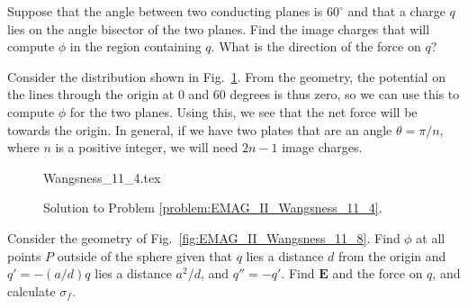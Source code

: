                 \begin{problem}
                    \label{problem:EMAG_II_Wangsness_11_4}
                    Suppose that the angle between two conducting planes
                    is $60^{\circ}$ and that a charge $q$ lies on the
                    angle bisector of the two planes. Find the image
                    charges that will compute $\phi$ in the region
                    containing $q$. What is the direction of the force
                    on $q$?
                \end{problem}
                \begin{solution}
                    Consider the distribution shown in
                    Fig.~\ref{fig:EMAG_II_Wangsness_11_4}. From the
                    geometry, the potential on the lines through the
                    origin at $0$ and $60$ degrees is thus zero, so we
                    can use this to compute $\phi$ for the two planes.
                    Using this, we see that the net force will be
                    towards the origin. In general, if we have two plates
                    that are an angle $\theta=\pi/n$, where $n$ is a
                    positive integer, we will need $2n-1$ image charges.
                \end{solution}
                \begin{figure}[H]
                    \centering
                    \captionsetup{type=figure}
                    {Wangsness_11_4.tex}
                    \caption{Solution to Problem
                             \ref{problem:EMAG_II_Wangsness_11_4}.}
                    \label{fig:EMAG_II_Wangsness_11_4}
                \end{figure}
                \begin{problem}
                    \label{problem:EMAG_II_Wangsness_11_8}
                    Consider the geometry of
                    Fig.~\ref{fig:EMAG_II_Wangsness_11_8}. Find
                    $\phi$ at all points $P$ outside of the
                    sphere given that $q$ lies a distance $d$ from the
                    origin and $q'=\minus(a/d)q$ lies a distance
                    $a^{2}/d$, and $q''=\minus{q}'$. Find
                    $\mathbf{E}$ and the force on $q$, and
                    calculate $\sigma_{f}$.
                \end{problem}
